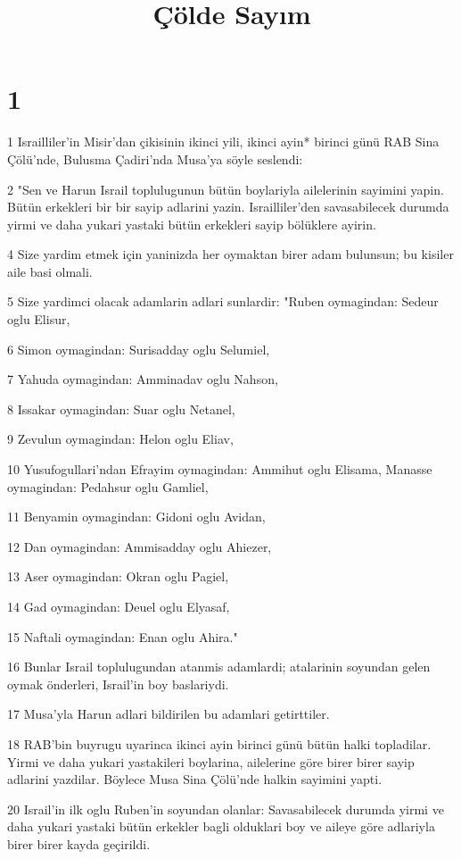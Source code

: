 

\title{Çölde Sayım}


\chapter{1}

\par 1 Israilliler'in Misir'dan çikisinin ikinci yili, ikinci ayin* birinci günü RAB Sina Çölü'nde, Bulusma Çadiri'nda Musa'ya söyle seslendi:
\par 2 "Sen ve Harun Israil toplulugunun bütün boylariyla ailelerinin sayimini yapin. Bütün erkekleri bir bir sayip adlarini yazin. Israilliler'den savasabilecek durumda yirmi ve daha yukari yastaki bütün erkekleri sayip bölüklere ayirin.
\par 4 Size yardim etmek için yaninizda her oymaktan birer adam bulunsun; bu kisiler aile basi olmali.
\par 5 Size yardimci olacak adamlarin adlari sunlardir: "Ruben oymagindan: Sedeur oglu Elisur,
\par 6 Simon oymagindan: Surisadday oglu Selumiel,
\par 7 Yahuda oymagindan: Amminadav oglu Nahson,
\par 8 Issakar oymagindan: Suar oglu Netanel,
\par 9 Zevulun oymagindan: Helon oglu Eliav,
\par 10 Yusufogullari'ndan Efrayim oymagindan: Ammihut oglu Elisama, Manasse oymagindan: Pedahsur oglu Gamliel,
\par 11 Benyamin oymagindan: Gidoni oglu Avidan,
\par 12 Dan oymagindan: Ammisadday oglu Ahiezer,
\par 13 Aser oymagindan: Okran oglu Pagiel,
\par 14 Gad oymagindan: Deuel oglu Elyasaf,
\par 15 Naftali oymagindan: Enan oglu Ahira."
\par 16 Bunlar Israil toplulugundan atanmis adamlardi; atalarinin soyundan gelen oymak önderleri, Israil'in boy baslariydi.
\par 17 Musa'yla Harun adlari bildirilen bu adamlari getirttiler.
\par 18 RAB'bin buyrugu uyarinca ikinci ayin birinci günü bütün halki topladilar. Yirmi ve daha yukari yastakileri boylarina, ailelerine göre birer birer sayip adlarini yazdilar. Böylece Musa Sina Çölü'nde halkin sayimini yapti.
\par 20 Israil'in ilk oglu Ruben'in soyundan olanlar: Savasabilecek durumda yirmi ve daha yukari yastaki bütün erkekler bagli olduklari boy ve aileye göre adlariyla birer birer kayda geçirildi.
